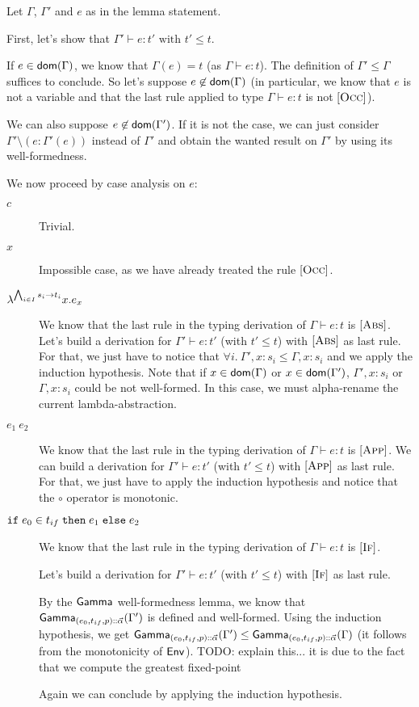 \documentclass[a4paper]{article}
\theoremstyle{definition}
\begin{document}
        Let $\Gamma$, $\Gamma'$ and $e$ as in the lemma statement.

        First, let's show that $\Gamma' \vdash e:t' \text{ with } t' \leq t$.
    
        If $e\in\textsf{dom}(\Gamma)$, we know that $\Gamma(e)=t$ (as $\Gamma \vdash e:t$). The definition of $\Gamma' \leq \Gamma$ suffices to conclude.
        So let's suppose $e\not\in\textsf{dom}(\Gamma)$ (in particular, we know that $e$ is not a variable and that the last rule applied to type $\Gamma \vdash e:t$ is not $[\textsc{Occ}]$).
    
        We can also suppose $e\not\in\textsf{dom}(\Gamma')$. If it is not the case, we can just consider $\Gamma'\setminus(e:\Gamma'(e))$ instead of $\Gamma'$
        and obtain the wanted result on $\Gamma'$ by using its well-formedness.

        We now proceed by case analysis on $e$:
        \begin{description}
          \item[$c$] Trivial.
          \item[$x$] Impossible case, as we have already treated the rule $[\textsc{Occ}]$.
          \item[$\lambda^{\bigwedge_{i\in I} s_i\to t_i}x.e_x$] We know that the last rule in the typing derivation of $\Gamma \vdash e:t$ is $[\textsc{Abs}]$.
          Let's build a derivation for $\Gamma' \vdash e:t'$ (with $t'\leq t$) with $[\textsc{Abs}]$ as last rule.
          For that, we just have to notice that $\forall i.\ \Gamma',x:s_i \leq \Gamma,x:s_i$ and we apply the induction hypothesis.
          Note that if $x \in \textsf{dom}(\Gamma)$ or $x \in \textsf{dom}(\Gamma')$, $\Gamma',x:s_i$ or $\Gamma,x:s_i$ could be not well-formed.
          In this case, we must alpha-rename the current lambda-abstraction.

          \item[$e_1\ e_2$] We know that the last rule in the typing derivation of $\Gamma \vdash e:t$ is $[\textsc{App}]$.
          We can build a derivation for $\Gamma' \vdash e:t'$ (with $t'\leq t$) with $[\textsc{App}]$ as last rule.
          For that, we just have to apply the induction hypothesis and notice that the $\circ$ operator is monotonic.
          \item[$\texttt{if}\;e_0\in t_{if}\;\texttt{then}\;e_1\;\texttt{else}\;e_2$]
          We know that the last rule in the typing derivation of $\Gamma \vdash e:t$ is $[\textsc{If}]$.

          Let's build a derivation for $\Gamma' \vdash e:t'$ (with $t'\leq t$) with $[\textsc{If}]$ as last rule.

          By the $\textsf{Gamma}_{}$ well-formedness lemma, we know that $\textsf{Gamma}_{{(e_0,t_{if},p)}\textsf{::}{\vec \alpha}}(\Gamma')$ is defined and well-formed.
          Using the induction hypothesis, we get $\textsf{Gamma}_{{(e_0,t_{if},p)}\textsf{::}{\vec \alpha}}(\Gamma') \leq \textsf{Gamma}_{{(e_0,t_{if},p)}\textsf{::}{\vec \alpha}}(\Gamma)$ (it follows from the monotonicity of $\textsf{Env}^{}_{}$).
          TODO: explain this... it is due to the fact that we compute the greatest fixed-point

          Again we can conclude by applying the induction hypothesis.\\
        \end{description}
    
\end{document}
